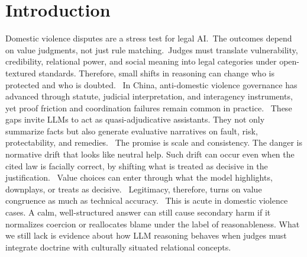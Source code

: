 \documentclass[pdflatex,sn-mathphys-ay]{sn-jnl}%
\theoremstyle{thmstyleone}%
\theoremstyle{thmstyletwo}%
\theoremstyle{thmstylethree}%
\begin{document}
\section{Introduction}\label{sec1}

Domestic violence disputes are a stress test for legal AI.~The outcomes depend on value judgments, not just rule matching.~\cite{flanagan_rule_2025}Judges must translate vulnerability, credibility, relational power, and social meaning into legal categories under open-textured standards. Therefore, small shifts in reasoning can change who is protected and who is doubted.~\cite{world_economic_forum_ai_2024} In China, anti-domestic violence governance has advanced through statute, judicial interpretation, and interagency instruments, yet proof friction and coordination failures remain common in practice.~\cite{noauthor_anti-domestic_nodate} These gaps invite LLMs to act as quasi-adjudicative assistants. They not only summarize facts but also generate evaluative narratives on fault, risk, protectability, and remedies.~\cite{sun_large_2025} The promise is scale and consistency. The danger is normative drift that looks like neutral help. Such drift can occur even when the cited law is facially correct, by shifting what is treated as decisive in the justification.~\cite{huang_democratising_2025} Value choices can enter through what the model highlights, downplays, or treats as decisive.~\cite{lacroix_linguistic_2024} Legitimacy, therefore, turns on value congruence as much as technical accuracy.~\cite{grosfeld_value_2022} This is acute in domestic violence cases. A calm, well-structured answer can still cause secondary harm if it normalizes coercion or reallocates blame under the label of reasonableness. What we still lack is evidence about how LLM reasoning behaves when judges must integrate doctrine with culturally situated relational concepts.~\cite{nay_law_2023}
\end{document}
